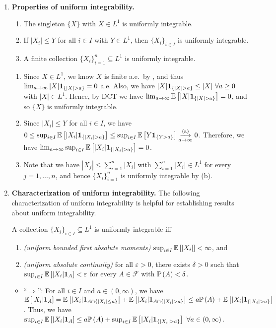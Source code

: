 \begin{enumerate}
\item\label{it:ui-prop} \textbf{Properties of uniform integrability.}
\begin{enumerate}
\item The singleton \(\{X\}\) with \(X\in L^1\) is uniformly integrable.
\item If \(|X_i|\le Y\) for all \(i\in I\) with \(Y\in L^1\), then \(\{X_i\}_{i\in
I}\) is uniformly integrable.
\item A finite collection \(\{X_i\}_{i=1}^{n}\subseteq L^1\) is
uniformly integrable.
\end{enumerate}
\begin{pf}
\begin{enumerate}
\item Since \(X\in L^1\), we know \(X\) is finite a.e.\ by
, and thus
\(\lim_{a\to\infty}|X|\indicset{|X|>a}=0\) a.e. Also, we have
\(|X|\indicset{|X|>a}\le|X|~\forall a\ge 0\) with \(|X|\in L^{1}\). Hence, by
DCT we have \(\lim_{a\to\infty}\expv{|X|\indicset{|X|>a}}=0\), and so \(\{X\}\)
is uniformly integrable.
\item Since \(|X_i|\le Y\) for all \(i\in I\), we have \(0\le\sup_{i\in
I}\expv{|X_i|\indicset{|X_i|>a}}\le\sup_{i\in
I}\expv{Y\indicset{Y>a}}\tox{a}{\text{(a)}}0\). Therefore,
we have \(\lim_{a\to\infty}\sup_{i\in I}\expv{|X_i|\indicset{|X_i|>a}}=0\).
\item Note that we have \(|X_j|\le\sum_{i=1}^{n}|X_i|\) with
\(\sum_{i=1}^{n}|X_i|\in L^1\) for every \(j=1,\dotsc,n\),
and hence \(\{X_i\}_{i=1}^{n}\) is uniformly integrable by (b).
\end{enumerate}
\end{pf}
\item \label{it:ui-char} \textbf{Characterization of uniform integrability.}
The following characterization of uniform integrability is helpful for
establishing results about uniform integrability.
\begin{theorem}
\label{thm:ui-char}
A collection \(\{X_i\}_{i\in I}\subseteq L^1\) is uniformly integrable iff
\begin{enumerate}
\item \emph{(uniform bounded first absolute moments)} \(\sup_{i\in
I}\mathbb{E}\left[|X_i|\right]<\infty\), and
\item \emph{(uniform absolute continuity)} for all \(\varepsilon>0\), there
exists \(\delta>0\) such that \(\sup_{i\in I}\mathbb{E}\left[|X_i|\mathbf{1}_{A}\right]<\varepsilon\) for every \(A\in\mathcal{F}\) with \(\mathbb{P}\left(A\right)<\delta\).
\end{enumerate}
\end{theorem}
\begin{pf}
\begin{itemize}
\item ``\(\Rightarrow\)'': For all \(i\in I\) and \(a\in (0,\infty)\), we have
\(\expv{|X_i|\indic_{A}}=\expv{|X_i|\indic_{A\cap \{|X_i|\le a\}}}
+\expv{|X_i|\indic_{A\cap\{|X_i|>a\}}}\le
a\prob{A}+\expv{|X_i|\indicset{|X_i|>a}}\). Thus, we have \(\sup_{i\in
I}\expv{|X_i|\indic_{A}}\le a\prob{A}+\sup_{i\in
I}\expv{|X_i|\indicset{|X_i|>a}}~\forall a\in (0,\infty)\).


\end{itemize}
\end{pf}
\end{enumerate}
